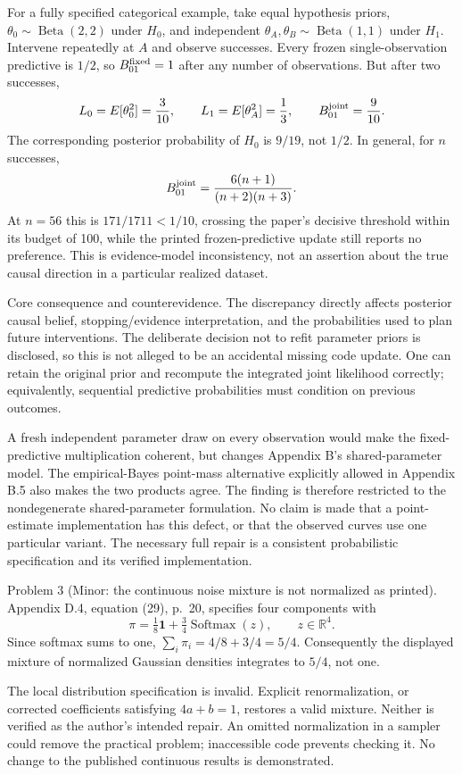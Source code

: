 \documentclass[10pt]{article}
\begin{document}
For a fully specified categorical example, take equal hypothesis priors, \(\theta_0\sim\operatorname{Beta}(2,2)\) under \(H_0\), and independent \(\theta_A,\theta_B\sim\operatorname{Beta}(1,1)\) under \(H_1\). Intervene repeatedly at \(A\) and observe successes. Every frozen single-observation predictive is \(1/2\), so \(B^{\rm fixed}_{01}=1\) after any number of observations. But after two successes, \[L_0=E[\theta_0^2]=\frac3{10},\qquad
 L_1=E[\theta_A^2]=\frac13,\qquad
 B^{\rm joint}_{01}=\frac9{10}.\] The corresponding posterior probability of \(H_0\) is \(9/19\), not \(1/2\). In general, for \(n\) successes, \[B^{\rm joint}_{01}=\frac{6(n+1)}{(n+2)(n+3)}.\] At \(n=56\) this is \(171/1711<1/10\), crossing the paper’s decisive threshold within its budget of 100, while the printed frozen-predictive update still reports no preference. This is evidence-model inconsistency, not an assertion about the true causal direction in a particular realized dataset.\par
Core consequence and counterevidence. The discrepancy directly affects posterior causal belief, stopping/evidence interpretation, and the probabilities used to plan future interventions. The deliberate decision not to refit parameter priors is disclosed, so this is not alleged to be an accidental missing code update. One can retain the original prior and recompute the integrated joint likelihood correctly; equivalently, sequential predictive probabilities must condition on previous outcomes.\par
A fresh independent parameter draw on every observation would make the fixed-predictive multiplication coherent, but changes Appendix B’s shared-parameter model. The empirical-Bayes point-mass alternative explicitly allowed in Appendix B.5 also makes the two products agree. The finding is therefore restricted to the nondegenerate shared-parameter formulation. No claim is made that a point-estimate implementation has this defect, or that the observed curves use one particular variant. The necessary full repair is a consistent probabilistic specification and its verified implementation.\par
Problem 3 (Minor: the continuous noise mixture is not normalized as printed).  Appendix D.4, equation (29), p. 20, specifies four components with \[\pi=\tfrac18\mathbf1+\tfrac34\operatorname{Softmax}(z),\qquad z\in\mathbb R^4.\] Since softmax sums to one, \(\sum_i\pi_i=4/8+3/4=5/4\). Consequently the displayed mixture of normalized Gaussian densities integrates to \(5/4\), not one.\par
The local distribution specification is invalid. Explicit renormalization, or corrected coefficients satisfying \(4a+b=1\), restores a valid mixture. Neither is verified as the author’s intended repair. An omitted normalization in a sampler could remove the practical problem; inaccessible code prevents checking it. No change to the published continuous results is demonstrated.\par
\end{document}

